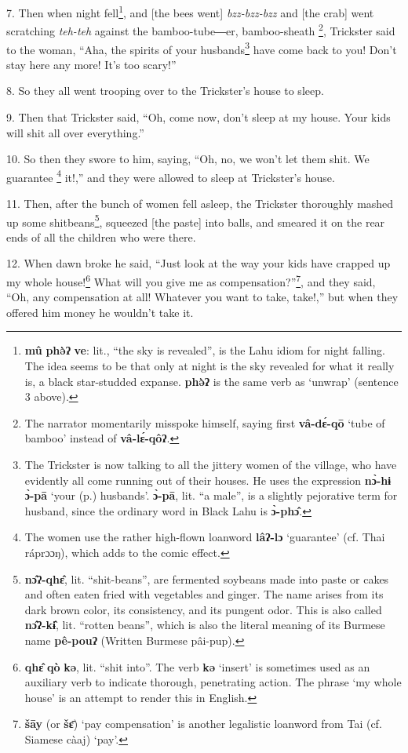 7. Then when night fell\footnote{\textbf{mû} \textbf{phə̀ʔ} \textbf{ve}: lit., ``the sky is revealed'', is the Lahu idiom for night falling. The idea seems to be that only at night is the sky revealed for what it really is, a black star-studded expanse. \textbf{phə̀ʔ} is the same verb as `unwrap' (sentence 3 above).}, and [the bees went] \textit{bzz-bzz-bzz} and [the
crab] went scratching \textit{teh-teh} against the bamboo-tube―er, bamboo-sheath
\footnote{The narrator momentarily misspoke himself, saying first \textbf{vâ-dɛ́-qō} `tube of bamboo' instead of \textbf{vâ-lɛ́-qôʔ}.}, Trickster said to the woman, ``Aha, the spirits of your husbands\footnote{The Trickster is now talking to all the jittery women of the village, who have evidently all come running out of their houses. He uses the expression \textbf{nɔ̀-hɨ} \textbf{ɔ̀-pā} `your (p.) husbands'. \textbf{ɔ̀-pā}, lit. ``a male'', is a slightly pejorative term for husband, since the ordinary word in Black Lahu is \textbf{ɔ̀-phɔ̂}.} have
come back to you! Don't stay here any more! It's too scary!''

8. So they all went trooping over to the Trickster's house to sleep.

9. Then that Trickster said, ``Oh, come now, don't sleep at my house. Your kids
will shit all over everything.''

10. So then they swore to him, saying, ``Oh, no, we won't let them shit. We guarantee
\footnote{The women use the rather high-flown loanword \textbf{lâʔ-lɔ} `guarantee' (cf. Thai ráprɔɔŋ), which adds to the comic effect.} it!,'' and they were allowed to sleep at Trickster's house.

11. Then, after the bunch of women fell asleep, the Trickster thoroughly mashed
up some shitbeans\footnote{\textbf{nɔ̂ʔ-qhɛ̂}, lit. ``shit-beans'', are fermented soybeans made into paste or cakes and often eaten fried with vegetables and ginger. The name arises from its dark brown color, its consistency, and its pungent odor. This is also called \textbf{nɔ̂ʔ-kɨ̂}, lit. ``rotten beans'', which is also the literal meaning of its Burmese name \textbf{pê-pouʔ} (Written Burmese pâi-pup).}, squeezed [the paste] into balls, and smeared it on the
rear ends of all the children who were there.

12. When dawn broke he said, ``Just look at the way your kids have crapped up my
whole house!\footnote{\textbf{qhɛ̂} \textbf{qò} \textbf{kə}, lit. ``shit into''. The verb \textbf{kə} `insert' is sometimes used as an auxiliary verb to indicate thorough, penetrating action. The phrase `my whole house' is an attempt to render this in English.} What will you give me as compensation?''\footnote{\textbf{šāy} (or \textbf{šɛ̄}) `pay compensation' is another legalistic loanword from Tai (cf. Siamese càaj) `pay'.}, and they said,
``Oh, any compensation at all! Whatever you want to take, take!,'' but when they
offered him money he wouldn't take it.

